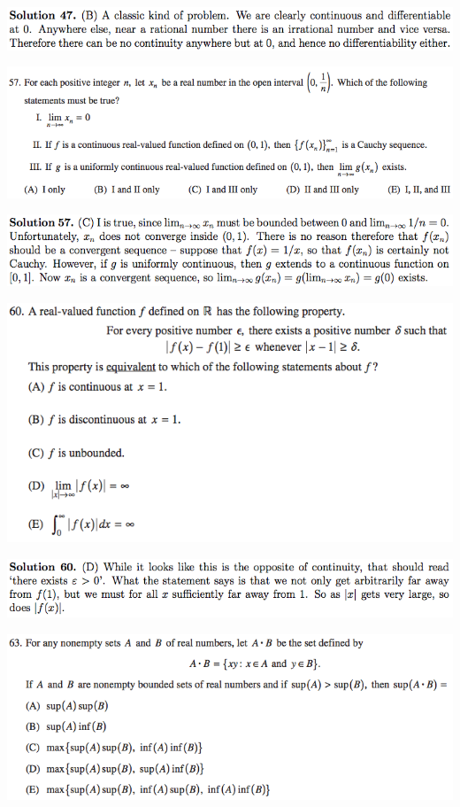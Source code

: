 \documentclass{article}
\begin{document}
\includegraphics[scale=0.65]{1268_47s}

\includegraphics[scale=0.65]{1268_57}

\includegraphics[scale=0.65]{1268_57s}

\includegraphics[scale=0.65]{1268_60}

\includegraphics[scale=0.65]{1268_60s}

\includegraphics[scale=0.65]{1268_63}
\end{document}
